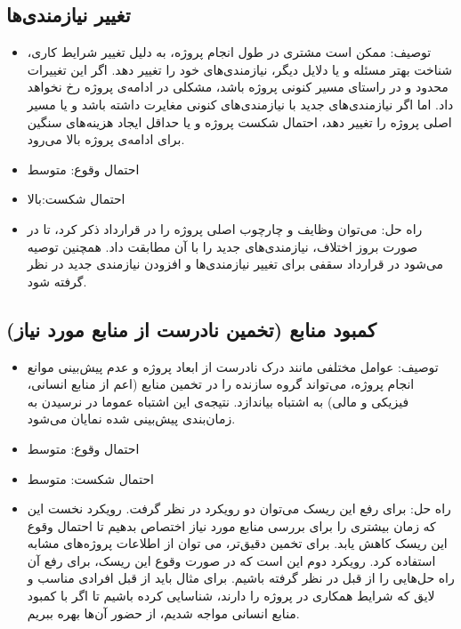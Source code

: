 \documentclass{article}
\begin{document}
\subsection{تغییر نیازمندی‌ها}
\begin{itemize}
\item توصیف: ممکن است مشتری در طول انجام پروژه، به دلیل تغییر شرایط کاری، شناخت بهتر مسئله و یا دلایل دیگر، نیازمندی‌های خود را تغییر دهد. اگر این تغییرات محدود و در راستای مسیر کنونی پروژه باشد، مشکلی در ادامه‌ی پروژه رخ نخواهد داد. اما اگر نیازمندی‌های جدید با نیازمندی‌های کنونی مغایرت داشته باشد و یا مسیر اصلی پروژه را تغییر دهد، احتمال شکست پروژه و یا حداقل ایجاد هزینه‌های سنگین برای ادامه‌ی پروژه بالا می‌رود.
\item احتمال وقوع: متوسط
\item احتمال شکست:بالا
\item راه حل: می‌توان وظایف و چارچوب اصلی پروژه را در قرارداد ذکر کرد، تا در صورت بروز اختلاف، نیازمندی‌های جدید را با آن مطابقت داد. همچنین توصیه می‌شود در قرارداد سقفی برای تغییر نیازمندی‌ها و افزودن نیازمندی جدید در نظر گرفته شود. 
\end{itemize}


\subsection{کمبود منابع (تخمین نادرست از منابع مورد نیاز)}
\begin{itemize}
\item توصیف: عوامل مختلفی مانند درک نادرست از ابعاد پروژه و عدم پیش‌بینی موانع انجام پروژه، می‌تواند گروه سازنده را در تخمین منابع (اعم از منابع انسانی، فیزیکی و مالی) به اشتباه بیاندازد. نتیجه‌ی این اشتباه عموما در نرسیدن به زمان‌بندی پیش‌بینی شده نمایان می‌شود.
\item احتمال وقوع: متوسط
\item احتمال شکست: متوسط
\item راه حل: برای رفع این ریسک می‌توان دو رویکرد در نظر گرفت. رویکرد نخست این که زمان بیشتری را برای بررسی منابع مورد نیاز اختصاص بدهیم تا احتمال وقوع این ریسک کاهش یابد. برای تخمین دقیق‌تر، می توان از اطلاعات پروژه‌های مشابه استفاده کرد.
رویکرد دوم این است که در صورت وقوع این ریسک، برای رفع آن راه حل‌هایی را از قبل در نظر گرفته باشیم. برای مثال باید از قبل افرادی مناسب و لایق که شرایط همکاری در پروژه را دارند، شناسایی کرده باشیم تا اگر با کمبود منابع انسانی مواجه شدیم، از حضور آن‌ها بهره ببریم.
\end{itemize}
\end{document}
